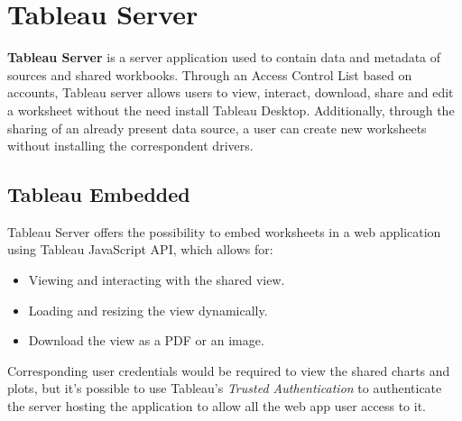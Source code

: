 \section{Tableau Server}

\textbf{Tableau Server} is a server application used to contain data and metadata of sources and shared workbooks. Through an Access Control List based on accounts, Tableau server allows users to view, interact, download, share and edit a worksheet without the need install Tableau Desktop. Additionally, through the sharing of an already present data source, a user can create new worksheets without installing the correspondent drivers.

\subsection{Tableau Embedded}

Tableau Server offers the possibility to embed worksheets in a web application using Tableau JavaScript API, which allows for:

\begin{itemize}
    \item Viewing and interacting with the shared view.
    \item Loading and resizing the view dynamically.
    \item Download the view as a PDF or an image.
\end{itemize}

Corresponding user credentials would be required to view the shared charts and plots, but it's possible to use Tableau's \textit{Trusted Authentication} to authenticate the server hosting the application to allow all the web app user access to it.